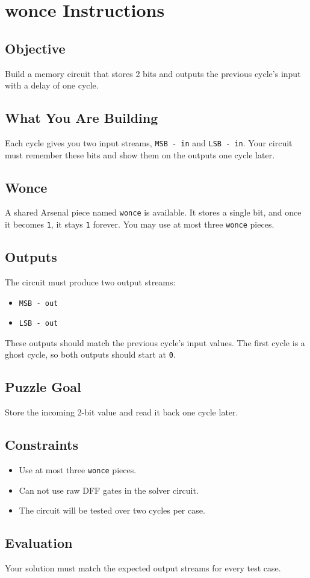 \section*{wonce Instructions}

\subsection*{Objective}
Build a memory circuit that stores 2 bits and outputs the previous cycle's input with a delay of one cycle.

\subsection*{What You Are Building}
Each cycle gives you two input streams, \texttt{MSB - in} and \texttt{LSB - in}.  
Your circuit must remember these bits and show them on the outputs one cycle later.

\subsection*{Wonce}
A shared Arsenal piece named \texttt{wonce} is available.  
It stores a single bit, and once it becomes \texttt{1}, it stays \texttt{1} forever.  
You may use at most three \texttt{wonce} pieces.

\subsection*{Outputs}
The circuit must produce two output streams:
\begin{itemize}
  \item \texttt{MSB - out}
  \item \texttt{LSB - out}
\end{itemize}

These outputs should match the previous cycle's input values.  
The first cycle is a ghost cycle, so both outputs should start at \texttt{0}.

\subsection*{Puzzle Goal}
Store the incoming 2-bit value and read it back one cycle later.

\subsection*{Constraints}
\begin{itemize}
  \item Use at most three \texttt{wonce} pieces.
  \item Can not use raw DFF gates in the solver circuit.
  \item The circuit will be tested over two cycles per case.
\end{itemize}

\subsection*{Evaluation}
Your solution must match the expected output streams for every test case.